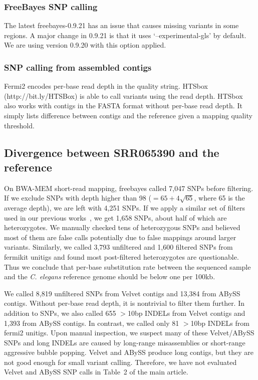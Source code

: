 \documentclass{bioinfo2}
\begin{document}
\subsubsection{FreeBayes SNP calling}
The latest freebayes-0.9.21 has an issue that causes missing variants in some
regions. A major change in 0.9.21 is that it uses `--experimental-gls' by
default. We are using version 0.9.20 with this option applied.

\subsubsection{SNP calling from assembled contigs}
Fermi2 encodes per-base read depth in the quality string. HTSbox
(http://bit.ly/HTSBox) is able to call variants using the read depth.
HTSbox also works with contigs in the FASTA format without per-base read depth.
It simply lists difference between contigs and the reference given a
mapping quality threshold.

\subsection{Divergence between SRR065390 and the reference}
On BWA-MEM short-read mapping, freebayes called 7,047 SNPs before filtering. If
we exclude SNPs with depth higher than 98 ($=65+4\sqrt{65}$, where 65 is the
average depth), we are left with 4,251 SNPs. If we apply a similar set of
filters used in our previous works~\citep{Li:2014aa}, we get 1,658 SNPs, about
half of which are heterozygotes. We manually checked tens of heterozygous SNPs
and believed most of them are false calls potentially due to false mappings
around larger variants. Similarly, we called 3,793 unfiltered and 1,600 filtered
SNPs from fermikit unitigs and found most post-filtered heterozygotes are
questionable. Thus we conclude that per-base substitution rate between the
sequenced sample and the {\it C. elegans} reference genome should be below one
per 100kb.

We called 8,819 unfiltered SNPs from Velvet contigs and 13,384 from ABySS contigs.
Without per-base read depth, it is nontrivial to filter them further. In addition
to SNPs, we also called 655 $>$10bp INDELs from Velvet contigs and 1,393 from
ABySS contigs. In contrast, we called only 81 $>$10bp INDELs from fermi2 unitigs.
Upon manual inspection, we suspect many of these Velvet/ABySS SNPs and long
INDELs are caused by long-range misassemblies or short-range aggressive bubble
popping.  Velvet and ABySS produce long contigs, but they are not good enough
for small variant calling. Therefore, we have not evaluated Velvet and ABySS
SNP calls in Table~2 of the main article.
\end{document}
